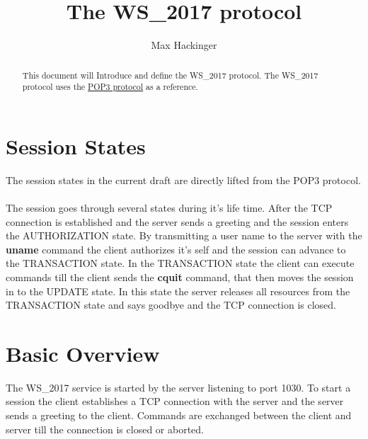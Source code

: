 \documentclass[a4paper,11pt]{article}
\title{The WS\_2017 protocol}
\author{Max Hackinger}
\begin{document}
\maketitle
\tableofcontents
\clearpage

\begin{abstract}
This document will Introduce and define the WS\_2017 protocol.
The WS\_2017 protocol uses the \href{https://tools.ietf.org/html/rfc1939}{POP3 protocol} as a reference.
\end{abstract}

\section{Session States}
The session states in the current draft are directly lifted from the POP3 protocol.\\\\
The session goes through several states during it's life time. After the TCP connection is established and the server sends a greeting and the session enters the AUTHORIZATION state. By transmitting a user name to the server with the \textbf{uname} command the client authorizes it's self and the session can advance to the TRANSACTION state. In the TRANSACTION state the client can execute commands till the client sends the \textbf{cquit} command, that then moves the session in to the UPDATE state. In this state the server releases all resources from the TRANSACTION state and says goodbye and the TCP connection is closed.

\section{Basic Overview}
The WS\_2017 service is started by the server listening to port 1030. To start a session the client establishes a TCP connection with the server and the server sends a greeting to the client. Commands are exchanged between the client and server till the connection is closed or aborted.
\end{document}
